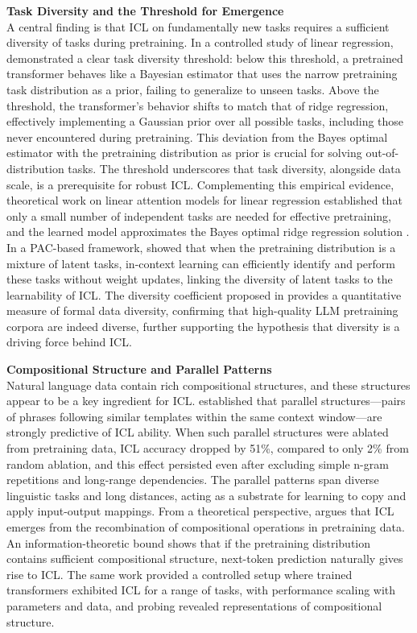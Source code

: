 \documentclass[11pt]{article}
\begin{document}
\textbf{Task Diversity and the Threshold for Emergence}\\
A central finding is that ICL on fundamentally new tasks requires a sufficient diversity of tasks during pretraining. In a controlled study of linear regression, \cite{ref31} demonstrated a clear task diversity threshold: below this threshold, a pretrained transformer behaves like a Bayesian estimator that uses the narrow pretraining task distribution as a prior, failing to generalize to unseen tasks. Above the threshold, the transformer's behavior shifts to match that of ridge regression, effectively implementing a Gaussian prior over all possible tasks, including those never encountered during pretraining. This deviation from the Bayes optimal estimator with the pretraining distribution as prior is crucial for solving out-of-distribution tasks. The threshold underscores that task diversity, alongside data scale, is a prerequisite for robust ICL. Complementing this empirical evidence, theoretical work on linear attention models for linear regression established that only a small number of independent tasks are needed for effective pretraining, and the learned model approximates the Bayes optimal ridge regression solution \cite{ref26}. In a PAC-based framework, \cite{ref21} showed that when the pretraining distribution is a mixture of latent tasks, in-context learning can efficiently identify and perform these tasks without weight updates, linking the diversity of latent tasks to the learnability of ICL. The diversity coefficient proposed in \cite{ref32} provides a quantitative measure of formal data diversity, confirming that high-quality LLM pretraining corpora are indeed diverse, further supporting the hypothesis that diversity is a driving force behind ICL.

\textbf{Compositional Structure and Parallel Patterns}\\
Natural language data contain rich compositional structures, and these structures appear to be a key ingredient for ICL. \cite{ref33} established that parallel structures---pairs of phrases following similar templates within the same context window---are strongly predictive of ICL ability. When such parallel structures were ablated from pretraining data, ICL accuracy dropped by 51\%, compared to only 2\% from random ablation, and this effect persisted even after excluding simple n-gram repetitions and long-range dependencies. The parallel patterns span diverse linguistic tasks and long distances, acting as a substrate for learning to copy and apply input-output mappings. From a theoretical perspective, \cite{ref34} argues that ICL emerges from the recombination of compositional operations in pretraining data. An information-theoretic bound shows that if the pretraining distribution contains sufficient compositional structure, next-token prediction naturally gives rise to ICL. The same work provided a controlled setup where trained transformers exhibited ICL for a range of tasks, with performance scaling with parameters and data, and probing revealed representations of compositional structure.
\end{document}
